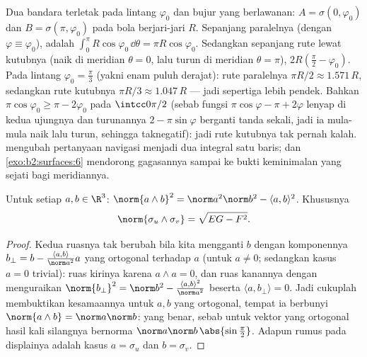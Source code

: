 \begin{example}\label{ex:b2:surfaces:polarroute}
Dua bandara terletak pada lintang $\varphi_0$ dan bujur
yang berlawanan: $A = \sigma(0, \varphi_0)$ dan $B = \sigma(\pi,
\varphi_0)$ pada bola berjari-jari $R$. Sepanjang paralelnya
(dengan $\varphi \equiv \varphi_0$),  adalah
$\int_0^\pi R\cos\varphi_0\,\dd\theta = \pi R\cos\varphi_0$.
Sedangkan sepanjang rute lewat kutubnya (naik di meridian $\theta = 0$,
lalu turun di meridian $\theta = \pi$),  $2R(\frac\pi2 -
\varphi_0)$. Pada lintang $\varphi_0 = \frac\pi3$ (yakni enam puluh
derajat): rute paralelnya $\pi R/2 \approx 1.571\,R$, sedangkan rute
kutubnya $\pi R/3 \approx 1.047\,R$ --- jadi sepertiga lebih pendek. Bahkan
$\pi\cos\varphi_0 \geq \pi - 2\varphi_0$ pada
$\intcc0{\pi/2}$ (sebab fungsi $\pi\cos\varphi - \pi +
2\varphi$ lenyap di kedua ujungnya dan turunannya $2 -
\pi\sin\varphi$ berganti tanda sekali, jadi ia mula-mula naik
lalu turun, sehingga taknegatif): jadi rute kutubnya tak pernah
kalah.  mengubah pertanyaan navigasi
menjadi dua integral satu baris; dan \cref{exo:b2:surfaces:6} mendorong
gagasannya sampai ke bukti keminimalan yang sejati bagi meridiannya.
\end{example}

\begin{lemma}\label{lem:b2:surfaces:lagrange}
Untuk setiap $a, b \in \R^3$:
$\norm{a \wedge b}^2 = \norm a^2 \norm b^2 - \langle a, b\rangle^2$.
Khususnya
\[
\norm{\sigma_u \wedge \sigma_v} = \sqrt{EG - F^2}.
\]
\end{lemma}

\begin{proof}
Kedua ruasnya tak berubah bila kita mengganti $b$ dengan komponennya $b_\perp
= b - \frac{\langle a, b\rangle}{\norm a^2}a$ yang ortogonal terhadap $a$
(untuk $a \neq 0$; sedangkan kasus $a = 0$ trivial): ruas kirinya
karena $a \wedge a = 0$, dan ruas kanannya dengan menguraikan $\norm
{b_\perp}^2 = \norm b^2 - \frac{\langle a,b\rangle^2}{\norm a^2}$
beserta $\langle a, b_\perp\rangle = 0$. Jadi cukuplah membuktikan
kesamaannya untuk $a, b$ yang ortogonal, tempat ia berbunyi $\norm{a \wedge
b} = \norm a \norm b$: yang benar, sebab untuk vektor yang ortogonal
hasil kali silangnya bernorma $\norm a\norm b\,\abs{\sin\frac\pi2}$. Adapun
rumus pada displainya adalah kasus $a = \sigma_u$ dan $b = \sigma_v$.
\end{proof}

